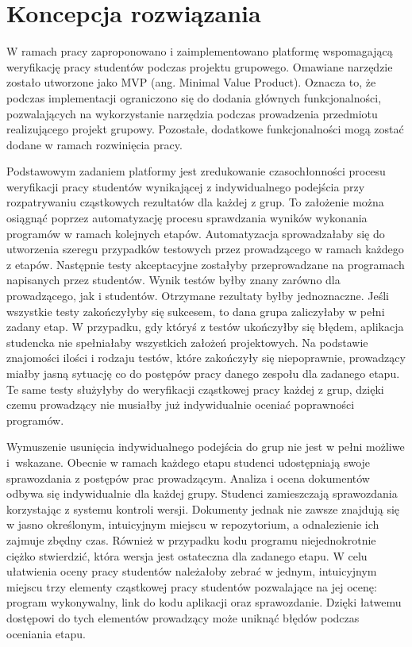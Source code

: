 \chapter{Koncepcja rozwiązania}
\label{requirements}

W ramach pracy zaproponowano i zaimplementowano platformę wspomagającą weryfikację pracy studentów podczas projektu grupowego.
Omawiane narzędzie zostało utworzone jako MVP (ang. Minimal Value Product).
Oznacza to, że podczas implementacji ograniczono się do dodania głównych funkcjonalności, pozwalających na wykorzystanie narzędzia podczas prowadzenia przedmiotu realizującego projekt grupowy.
Pozostałe, dodatkowe funkcjonalności mogą zostać dodane w ramach rozwinięcia pracy.

Podstawowym zadaniem platformy jest zredukowanie czasochłonności procesu weryfikacji pracy studentów wynikającej z indywidualnego podejścia przy rozpatrywaniu cząstkowych rezultatów dla każdej z grup.
To założenie można osiągnąć poprzez automatyzację procesu sprawdzania wyników wykonania programów w ramach kolejnych etapów.
Automatyzacja sprowadzałaby się do utworzenia szeregu przypadków testowych przez prowadzącego w ramach każdego z etapów.
Następnie testy akceptacyjne zostałyby przeprowadzane na programach napisanych przez studentów.
Wynik testów byłby znany zarówno dla prowadzącego, jak i studentów.
Otrzymane rezultaty byłby jednoznaczne.
Jeśli wszystkie testy zakończyłyby się sukcesem, to dana grupa zaliczyłaby w pełni zadany etap.
W przypadku, gdy któryś z testów ukończyłby się błędem, aplikacja studencka nie spełniałaby wszystkich założeń projektowych.
Na podstawie znajomości ilości i rodzaju testów, które zakończyły się niepoprawnie, prowadzący miałby jasną sytuację co do postępów pracy danego zespołu dla zadanego etapu.
Te same testy służyłyby do weryfikacji cząstkowej pracy każdej z grup, dzięki czemu prowadzący nie musiałby już indywidualnie oceniać poprawności programów.

Wymuszenie usunięcia indywidualnego podejścia do grup nie jest w pełni możliwe i~wskazane.
Obecnie w ramach każdego etapu studenci udostępniają swoje sprawozdania z postępów prac prowadzącym.
Analiza i ocena dokumentów odbywa się indywidualnie dla każdej grupy.
Studenci zamieszczają sprawozdania korzystając z systemu kontroli wersji.
Dokumenty jednak nie zawsze znajdują się w jasno określonym, intuicyjnym miejscu w repozytorium, a odnalezienie ich zajmuje zbędny czas.
Również w przypadku kodu programu niejednokrotnie ciężko stwierdzić, która wersja jest ostateczna dla zadanego etapu.
W celu ułatwienia oceny pracy studentów należałoby zebrać w jednym, intuicyjnym miejscu trzy elementy cząstkowej pracy studentów pozwalające na jej ocenę: program wykonywalny, link do kodu aplikacji oraz sprawozdanie.
Dzięki łatwemu dostępowi do tych elementów prowadzący może uniknąć błędów podczas oceniania etapu.

